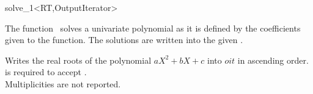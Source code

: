\begin{ccRefFunction}{solve_1<RT,OutputIterator>}

\ccDefinition

The function \ccRefName\ solves a univariate polynomial as it is defined by the 
coefficients given to the function. The solutions are written into the given
. 


{
Writes the real roots of the polynomial $aX^2+bX+c$ into $oit$ in ascending order. \\
 is required to accept . \\
Multiplicities are not reported. \\
} 

\ccSeeAlso
{}\\
\\
\\
\\
\\
\end{ccRefFunction}
